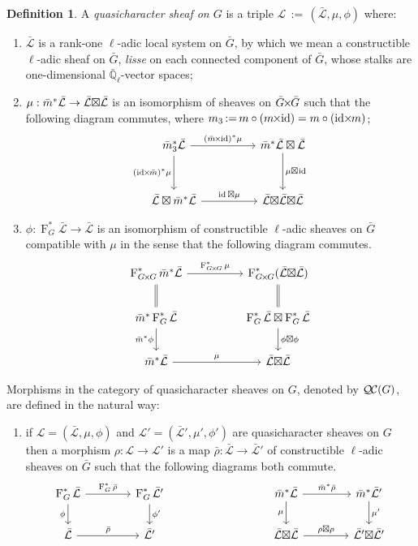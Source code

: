 \documentclass[10pt]{amsart}
\makeatletter
\theoremstyle{plain}
\theoremstyle{definition}
\newtheorem{definition}[theorem]{Definition}
\theoremstyle{remark}
\newcommand{\EE}{\mathbb{\bar Q}_\ell}
\newcommand{\Frob}[1]{\operatorname{F}_{#1}}
\DeclareMathOperator{\id}{id}
\newcommand{\ceq}{{\, :=\, }}
\newcommand{\qcs}[1]{{\mathcal{#1}}}
\newcommand{\gqcs}[1]{{\mathcal{\bar #1}}}
\newcommand{\QC}{{\mathcal{Q\hskip-0.8pt C}}}
\newcommand{\labitem}[2]{
\def\@itemlabel{\textbf{#1}}
\item
\def\@currentlabel{#1}\label{#2}}
\newcommand{\bm}{\bar{m}}
\newcommand{\bG}{\bar{G}}
\newcommand{\brho}{{\bar\rho}}
\newcommand{\tight}[3]{\hspace{-#1pt}{#2}\hspace{-#3pt}}
\newcommand{\bGxG}{\text{$\bar{G} \tight{1}{\times}{1} \bar{G}$}}
\newcommand{\GxxG}{\text{$G \tight{1}{\times}{1} G$}}
\newcommand{\LxL}{\text{$\gqcs{L} \tight{0}{\boxtimes}{0} \gqcs{L}$}}
\makeatother
\begin{document}
\begin{definition}\label{def:QC}
A \emph{quasicharacter sheaf on $G$} is a triple
$\qcs{L}\ceq (\gqcs{L},\mu,\phi)$ where:
\begin{enumerate}
\labitem{(QC.1)}{QC.1} $\gqcs{L}$ is a rank-one $\ell$-adic local system on $\bG$, by which we mean a constructible $\ell$-adic sheaf on $\bG$, {\it lisse} on each connected component of $\bG$, whose stalks are one-dimensional $\EE$-vector spaces;
\labitem{(QC.2)}{QC.2} $\mu: \bm^* \gqcs{L} \to \LxL$ is an isomorphism of
sheaves on $\bGxG$ such that the following diagram commutes,
  where $m_3 \ceq m\circ (m\tight{1}{\times}{2}\id) = m\circ (\id\tight{2}{\times}{1} m)$;
  \[
  \begin{tikzcd}[row sep=30]
  \bm_3^*\gqcs{L} \arrow{rr}{(\bm \tight{1}{\times}{2} \id)^*\mu} \arrow[swap]{d}{(\id \tight{2}{\times}{1} \bm)^*\mu}
    &&  \bm^*\gqcs{L} \boxtimes \gqcs{L} \dar{\mu \tight{0}{\boxtimes}{1} \id} \\
    \gqcs{L} \boxtimes \bm^* \gqcs{L} \arrow{rr}{\id \boxtimes \mu}
    &&  \gqcs{L} \tight{0}{\boxtimes}{0} \LxL
  \end{tikzcd}
  \]
\labitem{(QC.3)}{QC.3} $\phi : \Frob{G}^* \gqcs{L} \to \gqcs{L}$ is an
  isomorphism of constructible $\ell$-adic sheaves on $\bG$ compatible with
  $\mu$ in the sense that the following diagram commutes.
  \[
  \begin{tikzcd}[row sep=20]
  \Frob{\GxxG}^* \bm^* \gqcs{L} \arrow{rr}{\Frob{\GxxG}^*\mu}
    && \Frob{\GxxG}^*(\LxL)\\
    \arrow[equal]{u} \bm^*  \Frob{G}^* \gqcs{L} \arrow[swap]{d}{\bm^* \phi}
    && \Frob{G}^*\gqcs{L}\boxtimes \Frob{G}^*\gqcs{L} \dar{\phi\boxtimes \phi} \arrow[equal]{u} \\
    \bm^*\gqcs{L} \arrow{rr}{\mu}
    && \LxL
  \end{tikzcd}
  \]
\end{enumerate}
\end{definition}

Morphisms in the category of quasicharacter sheaves on $G$, denoted by $\QC(G)$, are defined in the natural way:
\begin{enumerate}
\labitem{(QC.4)}{QC.4} if $\qcs{L} = (\gqcs{L},\mu,\phi)$ and
  $\qcs{L'} = (\gqcs{L'},\mu',\phi')$ are quasicharacter sheaves on $G$ then
  a morphism $\rho : \qcs{L} \to \qcs{L}'$ is a map $\brho : \gqcs{L} \to \gqcs{L'}$
  of constructible $\ell$-adic sheaves on $\bG$ such that the following diagrams both commute.
  \[
  \begin{tikzcd}[column sep=40]
  \Frob{G}^* \gqcs{L} \rar{\Frob{G}^* \brho} \arrow[swap]{d}{\phi} & \Frob{G}^* \gqcs{L'} \dar{\phi'}
  & & \arrow[swap]{d}{\mu} \bm^* \gqcs{L} \rar{\bm^* \brho} & \bm^* \gqcs{L'} \dar{\mu'} \\
  \gqcs{L} \rar{\brho} & \gqcs{L'}
  & {} & \LxL \rar{\tight{1}{\rho\boxtimes \rho}{1}} & \gqcs{L'} \tight{0}{\boxtimes}{0} \gqcs{L'}
  \end{tikzcd}
  \]
\end{enumerate}
\end{document}
